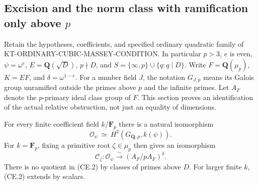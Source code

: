 \subsection{Excision and the norm class with ramification only above \(p\)}
\label{sec:kt-cubic-excision-norm}

Retain the hypotheses, coefficients, and specified ordinary quadratic
family of KT-ORDINARY-CUBIC-MASSEY-CONDITION.  In particular \(p>3\),
\(e\) is even, \(\psi=\omega^e\), \(E=\mathbf Q(\sqrt D)\),
\(p\nmid D\), and
\(S=\{\infty,p\}\cup\{q:q\mid D\}\).
Write \(F=\mathbf Q(\mu_p)\), \(K=EF\), and
\(\delta=\omega^{1-e}\).  For a number field \(J\), the notation
\(G_{J,p}\) means its Galois group unramified outside the primes above
\(p\) and the infinite primes.  Let \(A_F\) denote the \(p\)-primary
ideal class group of \(F\).  This section proves an identification of
the actual relative obstruction, not just an equality of dimensions.

\begin{theorem}
For every finite coefficient field \(k/\mathbf F_p\) there is a
natural isomorphism
\[
 \mathcal O_\psi\ \simeq\ H^2(G_{\mathbf Q,p},k(\psi)).
                                                        \tag{CE.1}
\]
For \(k=\mathbf F_p\), fixing a primitive root \(\zeta\in\mu_p\)
then gives an isomorphism
\[
 \mathcal C_\zeta:\mathcal O_\psi
      \xrightarrow{\ \sim\ }(A_F/pA_F)^{\delta}.
                                                        \tag{CE.2}
\]
There is no quotient in (CE.2) by classes of primes above \(D\).
For larger finite \(k\), (CE.2) extends by scalars.
\end{theorem}

